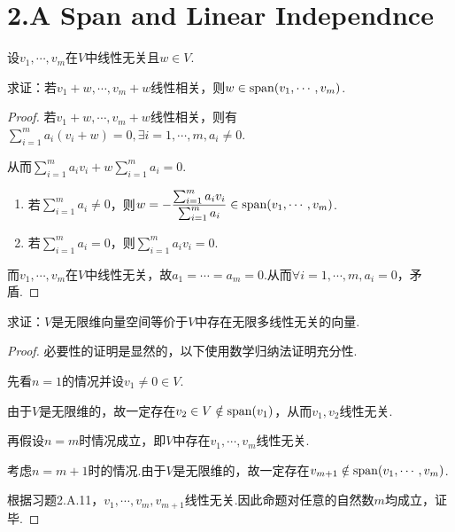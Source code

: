 \section{2.A Span and Linear Independnce}

\begin{problem}[10]\label{2.A.10}
    设\(v_1,\cdots,v_m\)在\(V\)中线性无关且\(w\in V\).

    求证：若\(v_1+w,\cdots,v_m+w\)线性相关，则\(w\in \operatorname{span} (v_1,\cdots,v_m)\).
\end{problem}

\begin{proof}
    若\(v_1+w,\cdots,v_m+w\)线性相关，则有\(\sum_{i=1}^m a_i(v_i+w)=0,\exists i=1,\cdots,m,a_i\ne 0\).
    
    从而\(\sum_{i=1}^m a_iv_i+w\sum_{i=1}^m a_i=0\).

    \begin{enumerate}
        \item 若\(\sum_{i=1}^m a_i\ne 0\)，则\(w=-\dfrac{\sum_{i=1}^m a_iv_i}{\sum_{i=1}^m a_i}\in \operatorname{span} (v_1,\cdots,v_m)\).
        \item 若\(\sum_{i=1}^m a_i=0\)，则\(\sum_{i=1}^m a_iv_i=0\).
    \end{enumerate}

    而\(v_1,\cdots,v_m\)在\(V\)中线性无关，故\(a_1=\cdots=a_m=0\).从而\(\forall i=1,\cdots,m, a_i=0\)，矛盾.
\end{proof}

\begin{problem}[13]\label{2.A.13}
    求证：\(V\)是无限维向量空间等价于\(V\)中存在无限多线性无关的向量.
\end{problem}

\begin{proof}
    必要性的证明是显然的，以下使用数学归纳法证明充分性.
    
    先看\(n=1\)的情况并设\(v_1 \ne 0 \in V\).
    
    由于\(V\)是无限维的，故一定存在\(v_2 \in V \notin \operatorname{span}(v_1)\)，从而\(v_1,v_2\)线性无关.
    
    再假设\(n=m\)时情况成立，即\(V\)中存在\(v_1,\cdots,v_m\)线性无关.
    
    考虑\(n=m+1\)时的情况.由于\(V\)是无限维的，故一定存在\(v_{m+1} \notin \operatorname{span}(v_1,\cdots,v_m)\).
    
    根据习题2.A.11，\(v_1,\cdots,v_m,v_{m+1}\)线性无关.因此命题对任意的自然数\(m\)均成立，证毕.
\end{proof}

